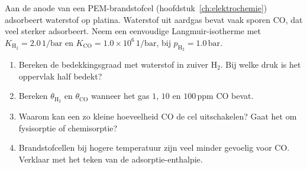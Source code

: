 \begin{oefening}
Aan de anode van een PEM-brandstofcel (hoofdstuk~\ref{ch:elektrochemie}) adsorbeert waterstof op platina. Waterstof uit aardgas bevat vaak sporen CO, dat veel sterker adsorbeert. Neem een eenvoudige Langmuir-isotherme met \(K_{\mathrm{H_2}} = 2.0\,\mathrm{1/bar}\) en \(K_{\mathrm{CO}} = 1.0\times10^{6}\,\mathrm{1/bar}\), bij \(p_{\mathrm{H_2}} = 1.0\,\mathrm{bar}\).

\begin{enumerate}
\item[(a)]
  Bereken de bedekkingsgraad met waterstof in zuiver \(\mathrm{H_2}\). Bij welke druk is het oppervlak half bedekt?
\item[(b)]
  Bereken \(\theta_{\mathrm{H_2}}\) en \(\theta_{\mathrm{CO}}\) wanneer het gas \(1\), \(10\) en \(100\,\mathrm{ppm}\) CO bevat.
\item[(c)]
  Waarom kan een zo kleine hoeveelheid CO de cel uitschakelen? Gaat het om fysisorptie of chemisorptie?
\item[(d)]
  Brandstofcellen bij hogere temperatuur zijn veel minder gevoelig voor CO. Verklaar met het teken van de adsorptie-enthalpie.
\end{enumerate}
\end{oefening}
